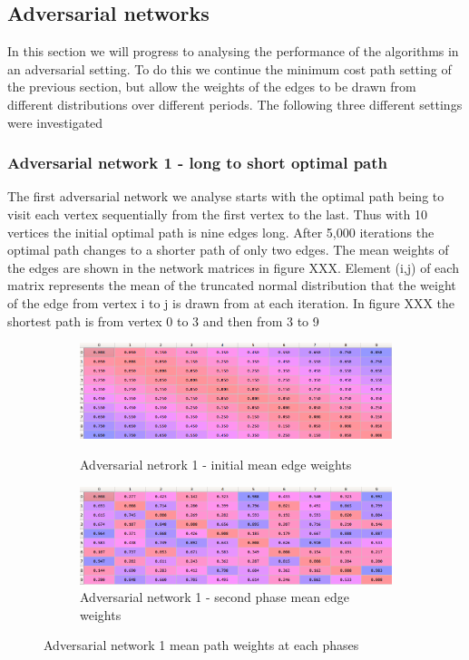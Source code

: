 \subsection{Adversarial networks}

In this section we will progress to analysing the performance of the algorithms in an adversarial setting. To do this we continue the minimum cost path setting of the previous section, but allow the weights of the edges to be drawn from different distributions over different periods. The following three different settings were investigated\\

\subsubsection{Adversarial network 1 - long to short optimal path}

The first adversarial network we analyse starts with the optimal path being to visit each vertex sequentially from the first vertex to the last. Thus with 10 vertices the initial optimal path is nine edges long. After 5,000 iterations the optimal path changes to a shorter path of only two edges. The mean weights of the edges are shown in the network matrices in figure XXX. Element (i,j) of each matrix represents the mean of the truncated normal distribution that the weight of the edge from vertex i to j is drawn from at each iteration. In figure XXX the shortest path is from vertex 0 to 3 and then from 3 to 9\\

\begin{figure}[h!]
\centering
\begin{subfigure}{1.0\textwidth}
  \centering
  \includegraphics[width=14cm]{../plots/path_means1.png}
  \caption{Adversarial netrork 1 - initial mean edge weights}
  \label{}
  \includegraphics[width=14cm]{../plots/path_means2.png}
  \caption{Adversarial network 1 - second phase mean edge weights}
  \label{}
\end{subfigure}
\caption{Adversarial network 1 mean path weights at each phases}
\label{fig:ullm-particle}
\end{figure}



